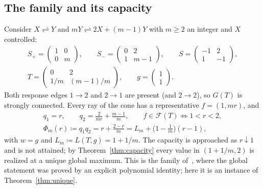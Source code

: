 \documentclass[11pt,a4paper]{article}
\theoremstyle{plain}
\theoremstyle{definition}
\theoremstyle{remark}
\numberwithin{equation}{section}
\newcommand{\Sp}{S_{+}}
\newcommand{\Sm}{S_{-}}
\newcommand{\cone}{\mathcal{F}}
\begin{document}
\subsection{The family and its capacity}
Consider $X\rightleftharpoons Y$ and $mY\rightleftharpoons2X+(m-1)Y$ with $m\ge2$ an integer and $X$ controlled:
\begin{equation}\label{eq:recyclingsource}
\begin{gathered}
 \Sp=\begin{pmatrix}1&0\\0&m\end{pmatrix},\qquad
 \Sm=\begin{pmatrix}0&2\\1&m-1\end{pmatrix},\qquad
 S=\begin{pmatrix}-1&2\\1&-1\end{pmatrix},\\[4pt]
 T=\begin{pmatrix}0&2\\1/m&(m-1)/m\end{pmatrix},\qquad g=\begin{pmatrix}1\\1\end{pmatrix}.
\end{gathered}
\end{equation}
Both response edges $1\to2$ and $2\to1$ are present (and $2\to2$), so $G(T)$ is strongly connected. Every ray of the cone has a representative $f=(1,mr)$, and
\begin{equation}\label{eq:recycle}
\begin{gathered}
 q_1=r,\qquad q_2=\frac{2}{mr}+\frac{m-1}{m},\qquad
 f\in\cone(T)\iff1<r<2,\\[2pt]
 \Phi_m(r)\coloneqq q_1q_2=r+\frac{2-r}{m}=L_m+\Big(1-\frac1m\Big)(r-1),
\end{gathered}
\end{equation}
with $w=g$ and $L_m\coloneqq L(T,g)=1+1/m$. The capacity is approached as $r\downarrow1$ and is not attained; by Theorem~\ref{thm:capacity} every value in $(1+1/m,2)$ is realized at a unique global maximum. This is the family of~\citep[Theorem~4.5]{companion2026}, where the global statement was proved by an explicit polynomial identity; here it is an instance of Theorem~\ref{thm:unique}.
\end{document}
